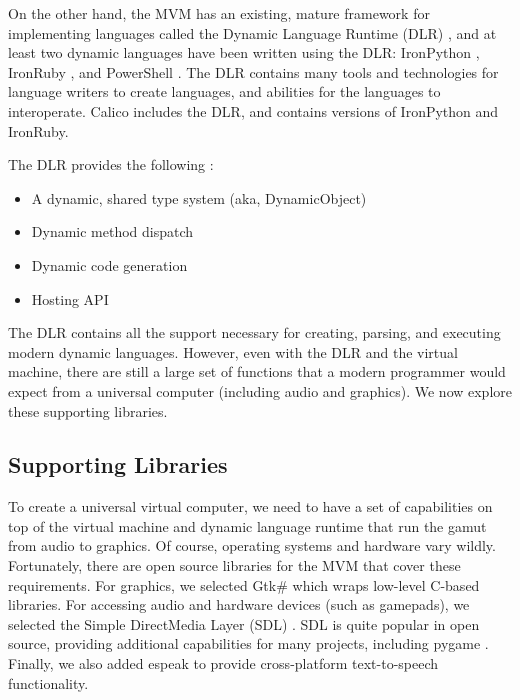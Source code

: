 \documentclass[preprint]{sigplanconf}
\begin{document}
On the other hand, the MVM has an existing, mature framework for
implementing languages called the Dynamic Language Runtime (DLR)
\cite{dynamic-language-runtime}, and at least two dynamic languages
have been written using the DLR: IronPython \cite{ironpython},
IronRuby \cite{ironruby}, and PowerShell \cite{powershell}. The DLR
contains many tools and technologies for language writers to create
languages, and abilities for the languages to interoperate. Calico
includes the DLR, and contains versions of IronPython and IronRuby.

The DLR provides the following \cite{dlr-wikipedia}:
\begin{itemize}
\item A dynamic, shared type system (aka, DynamicObject)
\item Dynamic method dispatch
\item Dynamic code generation
\item Hosting API
\end{itemize}

The DLR contains all the support necessary for creating, parsing, and
executing modern dynamic languages. However, even with the DLR and the
virtual machine, there are still a large set of functions that a
modern programmer would expect from a universal computer (including
audio and graphics). We now explore these supporting libraries.


\subsection{Supporting Libraries}

To create a universal virtual computer, we need to have a set of
capabilities on top of the virtual machine and dynamic language
runtime that run the gamut from audio to graphics. Of course,
operating systems and hardware vary wildly. Fortunately, there are
open source libraries for the MVM that cover these requirements. For
graphics, we selected Gtk\# \cite{gtk-sharp} which wraps low-level
C-based libraries. For accessing audio and hardware devices (such as
gamepads), we selected the Simple DirectMedia Layer (SDL)
\cite{sdl}. SDL is quite popular in open source, providing additional
capabilities for many projects, including pygame
\cite{pygame}. Finally, we also added espeak \cite{espeak} to provide
cross-platform text-to-speech functionality.

\end{document}
